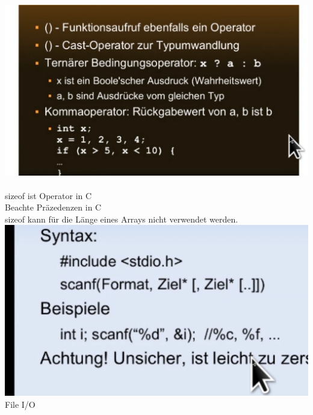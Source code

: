 \documentclass[paper=A4]{article}
\begin{document}
 	\includegraphics[width=\linewidth]{komma} \\ \\
 	sizeof ist Operator in C \\
 	Beachte Präzedenzen in C \\
 	sizeof kann für die Länge eines Arrays nicht verwendet werden. \\
 	\includegraphics[width=\linewidth]{scanf} \\
	File I/O \\
	
\end{document}
